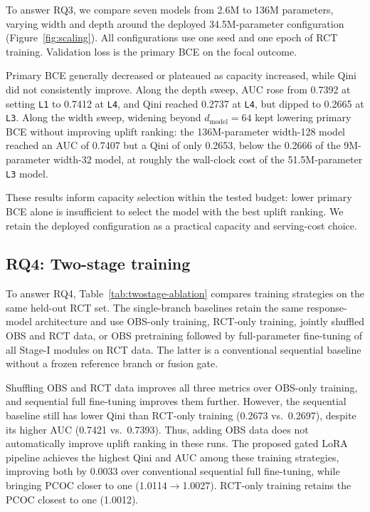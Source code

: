 \documentclass[sigconf,nonacm]{acmart}
\begin{document}
To answer RQ3, we compare seven models from 2.6M to 136M parameters,
varying width and depth around the deployed 34.5M-parameter configuration
(Figure~\ref{fig:scaling}). All configurations use one seed and one epoch
of RCT training. Validation loss is the primary BCE on the focal outcome.

Primary BCE generally decreased or plateaued as capacity increased, while
Qini did not consistently improve. Along the depth sweep, AUC rose from
0.7392 at setting \texttt{L1} to 0.7412 at \texttt{L4}, and Qini reached
0.2737 at \texttt{L4}, but dipped to 0.2665 at \texttt{L3}. Along the width sweep, widening beyond
$d_{\mathrm{model}}=64$ kept lowering primary BCE without improving
uplift ranking: the 136M-parameter width-128 model reached an AUC of 0.7407
but a Qini of only 0.2653, below the 0.2666 of the 9M-parameter width-32
model, at roughly the wall-clock cost of the 51.5M-parameter \texttt{L3} model.

These results inform capacity selection within the tested budget: lower
primary BCE alone is insufficient to select the model with the best uplift
ranking. We retain the deployed configuration as a practical capacity and
serving-cost choice.

\subsection{RQ4: Two-stage training}
\label{sec:twostage-eval}

To answer RQ4, Table~\ref{tab:twostage-ablation} compares training strategies
on the same held-out RCT set. The single-branch baselines retain the same
response-model architecture and use OBS-only training, RCT-only training,
jointly shuffled OBS and RCT data, or OBS pretraining followed by
full-parameter fine-tuning of all Stage-I modules on RCT data. The latter is a
conventional sequential baseline without a frozen reference branch or fusion
gate.

Shuffling OBS and RCT data improves all three metrics over OBS-only training,
and sequential full fine-tuning improves them further. However, the
sequential baseline still has lower Qini than RCT-only training
(0.2673 vs.\ 0.2697), despite its higher AUC (0.7421 vs.\ 0.7393).
Thus, adding OBS data does not automatically improve uplift ranking in
these runs. The proposed gated LoRA pipeline achieves the highest Qini
and AUC among these training strategies, improving both by 0.0033 over
conventional sequential full fine-tuning, while bringing PCOC closer to one (1.0114$\rightarrow$1.0027).
RCT-only training retains the PCOC closest to one (1.0012).
\end{document}
